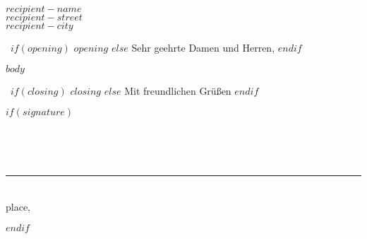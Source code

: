 \documentclass[DIN, pagenumber=false, parskip=half, fromalign=right]{scrlttr2}
\newcommand{\signature}[2]{%
  \parbox{\textwidth}{\
    \vspace{2cm}

    \parbox{7cm}{\
      \rule{6cm}{1pt}\\
       #1,\, #2
    }
  }
}
\begin{document}
\begin{letter}{\noindent
    $recipient-name$\\
    $recipient-street$\\
    $recipient-city$
  }

  \opening{\
  $if(opening)$
  $opening$
  $else$
  Sehr geehrte Damen und Herren,
  $endif$
}

$body$

\closing{\
  $if(closing)$
  $closing$
  $else$
  Mit freundlichen Grüßen
  $endif$
}

$if(signature)$
\signature{place}{\
  \usekomavar{date}
}
$endif$

\end{letter}
\end{document}
